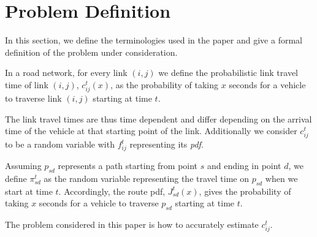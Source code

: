 \section{Problem Definition}
\label{sec:problemdef}
In this section, we define the terminologies used in the paper and give a formal definition of the problem under consideration.

\begin{definition} 
In a road network, for every link $(i, j)$ we define the probabilistic link travel time of link $(i,j)$, $c_{ij}^t(x)$, as the probability of taking $x$ seconds for a vehicle to traverse link $(i,j)$ starting at time $t$.
\end{definition}

The link travel times are thus time dependent and differ depending on the arrival time of the vehicle at that starting point of the link. Additionally we consider $c_{ij}^t$ to be a random variable with $f_{ij}^t$ representing its \textit{pdf}.

\begin{definition} 
Assuming $p_{sd}$ represents a path starting from point $s$ and ending in point $d$, we define $\pi_{sd}^t$ as the random variable representing the travel time on $p_{sd}$ when we start at time $t$. Accordingly, the route pdf, $J_{sd}^t(x)$, gives the probability of taking $x$ seconds for a vehicle to traverse $p_{sd}$ starting at time $t$.
\end{definition}

The problem considered in this paper is how to  accurately estimate $c_{ij}^t$.


